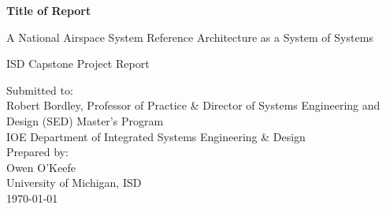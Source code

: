 \begin{titlepage}
\centering
\vspace*{2cm}
{\LARGE \textbf{Title of Report} \par}
\vspace{0.5cm}
{\Large A National Airspace System Reference Architecture as a System of Systems \par}
\vspace{1cm}
{\large ISD Capstone Project Report \par}
\vspace{2cm}

\begin{flushleft}
Submitted to: \\
Robert Bordley, Professor of Practice \& Director of Systems Engineering and Design (SED) Master’s Program \\
IOE Department of Integrated Systems Engineering \& Design \\[1em]

Prepared by: \\
Owen O'Keefe \\
University of Michigan, ISD \\[1em]

\today
\end{flushleft}


\vfill
\end{titlepage}

